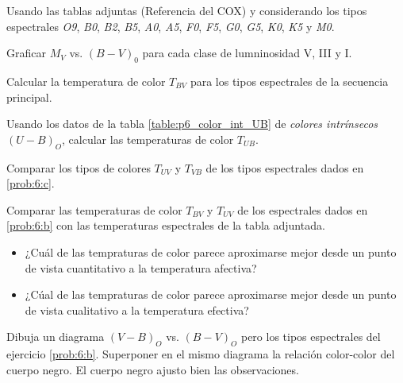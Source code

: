 \documentclass[12pt,a4paper]{practice}
\begin{document}
    \begin{problem}\label{prob:6}
        Usando las tablas adjuntas (Referencia del COX) y considerando los tipos espectrales \emph{O9}, \emph{B0}, \emph{B2}, \emph{B5}, \emph{A0}, \emph{A5}, \emph{F0}, \emph{F5}, \emph{G0}, \emph{G5}, \emph{K0}, \emph{K5} y \emph{M0}.

        \begin{ppart}\label{prob:6:a}
            Graficar $M_V$ vs. $\left(B-V\right)_{0}$ para cada clase de lumninosidad V, III y I.
        \end{ppart}

        \begin{ppart}\label{prob:6:b}
            Calcular la temperatura de color $T_{BV}$ para los tipos espectrales de la secuencia principal.
        \end{ppart}

        \begin{ppart}\label{prob:6:c}
            Usando los datos de la tabla \ref{table:p6_color_int_UB} de \emph{colores intrínsecos} $\left(U-B\right)_O$, calcular las temperaturas de color $T_{UB}$.
        \end{ppart}

        \begin{ppart}\label{prob:6:d}
            Comparar los tipos de colores $T_{UV}$ y $T_{VB}$ de los tipos espectrales dados en \ref{prob:6:c}.
        \end{ppart}

        \begin{ppart}\label{prob:6:e}
            Comparar las temperaturas de color $T_{BV}$ y $T_{UV}$ de los espectrales dados en \ref{prob:6:b} con las temperaturas espectrales de la tabla adjuntada.

            \begin{itemize}
                \item ¿Cuál de las tempraturas de color parece aproximarse mejor desde un punto de vista cuantitativo a la temperatura afectiva?
                \item ¿Cúal de las tempraturas de color parece aproximarse mejor desde un punto de vista cualitativo a la temperatura efectiva?
            \end{itemize}
        \end{ppart}
    \end{problem}

    \begin{problem}\label{prob:7}
        Dibuja un diagrama $\left(V-B\right)_O$ vs. $\left(B-V\right)_O$ pero los tipos espectrales del ejercicio \ref{prob:6:b}. Superponer en el mismo diagrama la relación color-color del cuerpo negro. El cuerpo negro ajusto bien las observaciones.
    \end{problem}
\end{document}
